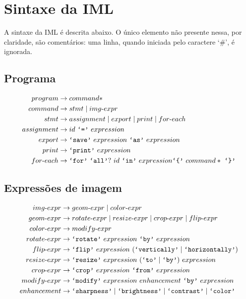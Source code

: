 \documentclass{article}
\newcommand{\literal}[1]{\text{\texttt{`#1'}}}
\newcommand{\tsp}{\text{ }}
\begin{document}
\section{Sintaxe da IML}
\label{sec:sintaxe}
A sintaxe da IML é descrita abaixo. O único elemento não presente nessa, por claridade, são comentários: uma linha, quando iniciada pelo caractere `\#', é ignorada.

\subsection{Programa}
\begin{align*}
program &\rightarrow command*\\
command &\rightarrow stmt \mid img\text{-}expr\\
stmt &\rightarrow assignment \mid export \mid print \mid for\text{-}each\\
assignment &\rightarrow id \tsp \literal{=} \tsp expression\\
export &\rightarrow \literal{save} \tsp expression \tsp \literal{as} \tsp expression\\
print &\rightarrow \literal{print} \tsp expression\\
for\text{-}each &\rightarrow \literal{for} \tsp \literal{all}? \tsp id \tsp \literal{in} \tsp expression \literal{\{} \tsp command* \tsp \literal{\}}\\
\end{align*}

\subsection{Expressões de imagem}
\begin{align*}
img\text{-}expr &\rightarrow geom\text{-}expr \mid color\text{-}expr\\
geom\text{-}expr &\rightarrow rotate\text{-}expr \mid resize\text{-}expr \mid crop\text{-}expr \mid flip\text{-}expr\\
color\text{-}expr &\rightarrow modify\text{-}expr\\
rotate\text{-}expr &\rightarrow \literal{rotate} \tsp expression \tsp \literal{by} \tsp expression\\
flip\text{-}expr &\rightarrow \literal{flip} \tsp expression \tsp (\literal{vertically} \mid \literal{horizontally})\\
resize\text{-}expr &\rightarrow \literal{resize} \tsp expression \tsp (\literal{to} \mid \literal{by}) \tsp expression\\
crop\text{-}expr &\rightarrow \literal{crop} \tsp expression \tsp \literal{from} \tsp expression\\
modify\text{-}expr &\rightarrow \literal{modify} \tsp expression \tsp enhancement \tsp \literal{by} \tsp expression\\
enhancement &\rightarrow \literal{sharpness} \mid \literal{brightness} \mid \literal{contrast} \mid \literal{color}\\
\end{align*}
\end{document}
